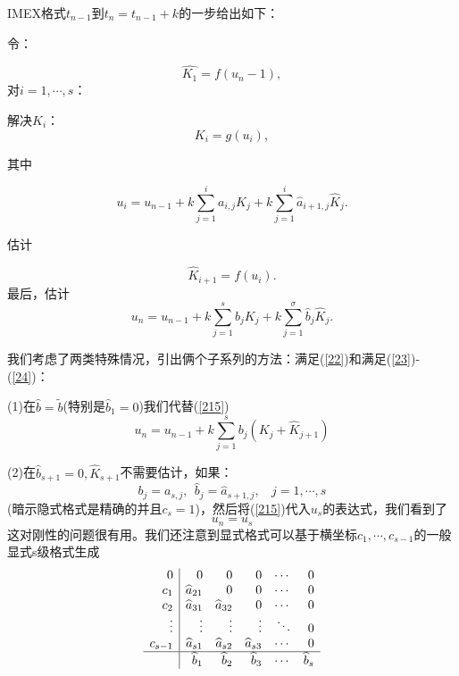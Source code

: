 \documentclass[12pt,a4paper]{article}
\begin{document}
IMEX格式$t_{n-1}$到$t_{n}=t_{n-1}+k$的一步给出如下：

令：

\begin{equation}
\widehat{K_{1}}=f(u_{n}-1),
\label{211}
\end{equation}
对$i=1,\cdots,s$：

\textbullet 解决$K_{i}$：
\begin{equation}
K_{i}=g(u_{i}),
\label{212}
\end{equation}

其中

\begin{equation}
u_{i}=u_{n-1}+k\sum_{j=1}^{i}a_{i,j}K_{j}+k\sum_{j=1}^{i}\widehat{a}_{i+1,j}\widehat{K}_{j}.
\label{213}
\end{equation}

\textbullet 估计

\begin{equation}
\widehat{K}_{i+1}=f(u_{i}).
\label{214}
\end{equation}
最后，估计
\begin{equation}
u_{n}=u_{n-1}+k\sum_{j=1}^{s}b_{j}K_{j}+k\sum_{j=1}^{\sigma}\widehat{b}_{j}\widehat{K}_{j}.
\label{215}
\end{equation}

我们考虑了两类特殊情况，引出俩个子系列的方法：满足(\ref{22})和满足(\ref{23})-(\ref{24})：

(1)在$\widehat{b}=\tilde{b}$(特别是$\widehat{b}_{1}=0$)我们代替(\ref{215})
\begin{equation}
u_{n}=u_{n-1}+k\sum_{j=1}^{s}b_{j}(K_{j}+\widehat{K}_{j+1})
\label{22}
\end{equation}

(2)在$\widehat{b}_{s+1}=0,\widehat{K}_{s+1}$不需要估计，如果：
\begin{equation}
b_{j}=a_{s,j},~~\widehat{b}_{j}=\widehat{a}_{s+1,j},~~~~j=1,\cdots,s
\label{23}
\end{equation}
(暗示隐式格式是精确的并且$c_{s}=1$)，然后将(\ref{215})代入$u_{s}$的表达式，我们看到了
\begin{equation}
u_{n}=u_{s}
\label{24}
\end{equation}
这对刚性的问题很有用。我们还注意到显式格式可以基于横坐标$c_{1},\cdots,c_{s-1}$的一般显式s级格式生成
\[
\begin{array}{r|r r r r r}
0 & 0 & 0 & 0 & \cdots & 0\\
c_{1}  & \widehat{a}_{21} & 0 & 0 & \cdots & 0\\
c_{2}  & \widehat{a}_{31} & \widehat{a}_{32} & 0 & \cdots & 0\\\
\vdots & \vdots & \vdots & \vdots & \ddots & 0\\
c_{s-1}  & \widehat{a}_{s1} & \widehat{a}_{s2} & \widehat{a}_{s3} & \cdots & 0\\
\hline
& \widehat{b}_{1} & \widehat{b}_{2} & \widehat{b}_{3} & \cdots & \widehat{b}_{s}
\end{array}
\]
\end{document}
